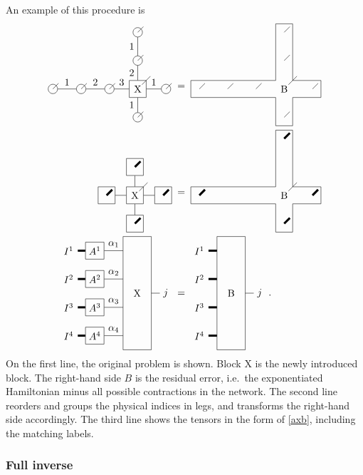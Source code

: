 \def \blockct { \begin{tikzpicture}[baseline=3]
        \draw (0,2.5)-- (0,-1.5) -- (1,-1.5)-- (1,2.5) -- cycle;

        \node[draw=none] (x)  at (0.5,0.5) {B};

        \draw[line width=0.75mm] (-0.3,2)  node [left] {$I^1$}  -- (0,2) ;
        \draw[line width=0.75mm] (-0.3,1)  node [left] {$I^2$} -- (0,1);
        \draw[line width=0.75mm] (-0.3,0)  node [left] {$I^3$} -- (0,0);
        \draw[line width=0.75mm] (-0.3,-1)  node [left] {$I^4$} -- (0,-1);

        \draw (1,0.5) -- (1.3,0.5)  node [right] {$j$} ;

    \end{tikzpicture} }

\noindent
An example of this procedure is
\begingroup
\allowdisplaybreaks
\begin{align}
    \pepoat                 \; & =  \;\blockat                                     \\
    \pepobt                 \; & =  \;\blockbt                                     \\
    \vcenter{\hbox{ \pepoct }} & =\vcenter{\hbox{  \blockct }} . \label{extract_x}
\end{align}
\endgroup
On the first line, the original problem is shown. Block X is the newly introduced block. The right-hand side $B$ is the residual error, i.e.\ the exponentiated Hamiltonian minus all possible contractions in the network. The second line reorders and groups the physical indices in legs, and transforms the right-hand side accordingly. The third line shows the tensors in the form of \cref{axb}, including the matching labels.

\subsubsection{Full inverse}

